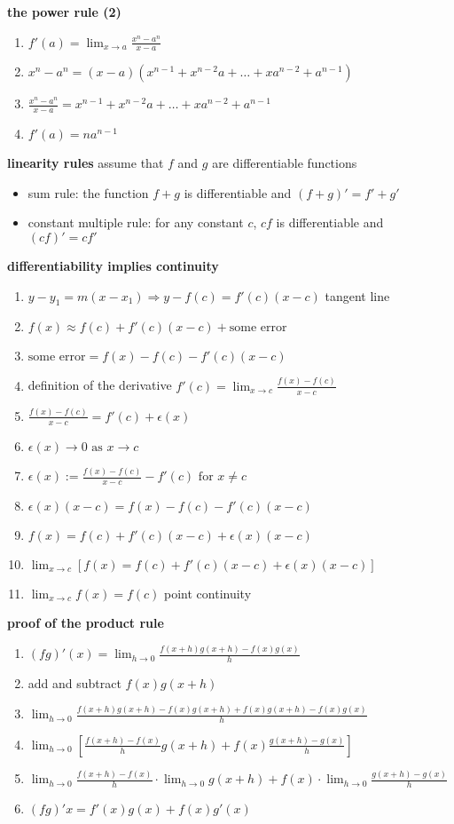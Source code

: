\documentclass{article}
\begin{document}
\textbf{the power rule (2)}
	\begin{enumerate}
		\item $f'(a) = \lim_{x \to a}\frac{x^n - a^n}{x - a}$
		\item $x^n - a^n = (x - a)(x^{n-1} + x^{n-2}a + \ldots + xa^{n-2} + a^{n-1})$
		\item $\frac{x^n - a^n}{x - a} = x^{n-1} + x^{n-2}a + \ldots + xa^{n-2} + a^{n-1}$ 
		\item $f'(a) = na^{n-1}$
	\end{enumerate}

\textbf{linearity rules} assume that $f$ and $g$ are differentiable functions
	\begin{itemize}
		\item sum rule: the function $f + g$ is differentiable and $(f + g)' = f' + g'$
		\item constant multiple rule: for any constant $c$, $cf$ is differentiable and $(cf)' = cf'$
	\end{itemize}

\textbf{differentiability implies continuity} 	
	\begin{enumerate}
		\item $y - y_1 = m(x - x_1) \Rightarrow y - f(c) = f'(c)(x - c)$ tangent line
		\item $f(x) \approx f(c) + f'(c)(x - c) + \text{some error}$
		\item $\text{some error} = f(x) - f(c) - f'(c)(x - c)$
		\item definition of the derivative $f'(c) = \lim_{x \to c}\frac{f(x) - f(c)}{x - c}$
		\item $\frac{f(x) - f(c)}{x - c} = f'(c) + \epsilon(x)$
		\item $\epsilon(x) \to 0 \text{ as } x \to c$
		\item $\epsilon(x) := \frac{f(x) - f(c)}{x - c} - f'(c) \text{ for } x \neq c$
		\item $\epsilon(x)(x - c) = f(x) - f(c) - f'(c)(x - c)$
		\item $f(x) = f(c) + f'(c)(x - c) + \epsilon(x)(x - c)$
		\item $\lim_{x \to c}[f(x) = f(c) + f'(c)(x - c) + \epsilon(x)(x - c)]$
		\item $\lim_{x \to c}f(x) = f(c)$ point continuity
	\end{enumerate}

\textbf{proof of the product rule}
	\begin{enumerate}
		\item $(fg)'(x) = \lim_{h \to 0}\frac{f(x + h)g(x + h) - f(x)g(x)}{h}$
		\item add and subtract $f(x)g(x + h)$
		\item $\lim_{h \to 0}\frac{f(x + h)g(x + h) - f(x)g(x + h) + f(x)g(x + h) - f(x)g(x)}{h}$
		\item $\lim_{h \to 0}[\frac{f(x + h) - f(x)}{h}g(x + h) + f(x)\frac{g(x + h) - g(x)}{h}]$
		\item $\lim_{h \to 0}\frac{f(x + h) - f(x)}{h} \cdot \lim_{h \to 0}g(x + h) + f(x) \cdot \lim_{h \to 0}\frac{g(x + h) - g(x)}{h}$
		\item $(fg)'x = f'(x)g(x) + f(x)g'(x)$
	\end{enumerate}
\end{document}
